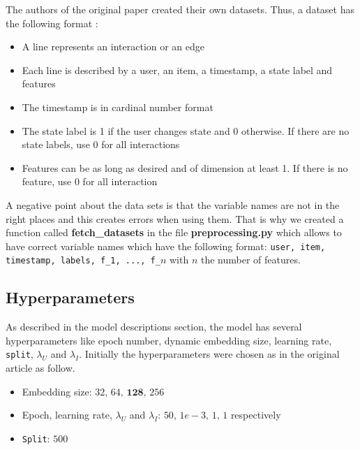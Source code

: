 The authors of the original paper created their own datasets. Thus, a dataset has the following format :
\begin{itemize}
    \item A line represents an interaction or an edge
    \item Each line is described by a user, an item, a timestamp, a state label and features
    \item The timestamp is in cardinal number format
    \item The state label is 1 if the user changes state and 0 otherwise. If there are no state labels, use 0 for all interactions
    \item Features can be as long as desired and of dimension at least 1. If there is no feature, use 0 for all interaction
\end{itemize}
A negative point about the data sets is that the variable names are not in the right places and this creates errors when using them. That is why we created a function called \textbf{fetch\_datasets} in the file \textbf{preprocessing.py} which allows to have correct variable names which have the following format: \texttt{user, item, timestamp, labels, f\_1, ..., f\_$n$} with $n$ the number of features.\\

\subsection*{Hyperparameters}


As described in the model descriptions section, the model has several hyperparameters like epoch number, dynamic embedding size, learning rate, \texttt{split}, $\lambda_U$ and $\lambda_I$. Initially the hyperparameters were chosen as in the original article as follow.

\begin{itemize}
    \item Embedding size: $32, \, 64, \, \textbf{128}, \, 256$
    \item Epoch, learning rate, $\lambda_U$ and $\lambda_I$: $50, \, 1e-3, \, 1, \, 1$ respectively
    \item \texttt{Split}: $500$
\end{itemize}

